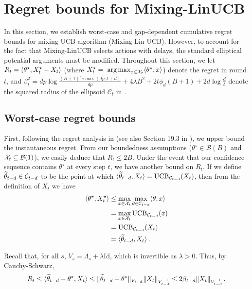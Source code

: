 \section{Regret bounds for Mixing-LinUCB}
\label{sec:bandit_regret}

In this section, we establish worst-case and gap-dependent cumulative regret bounds for mixing UCB algorithm (Mixing Lin-UCB). However, to account for the fact that Mixing-LinUCB selects actions with delays, the standard elliptical potential arguments must be modified. Throughout this section, we let $R_t = \langle\theta^{\star},X_t^{\star} - X_t\rangle$ (where $X_t^\star = \mathop{\mbox{ arg\,max}}_{x\in\mathcal{X}_t}\langle \theta^\star, x\rangle$) denote the regret in round $t$, and $\beta_{t}^2 = dp\log\tfrac{(B+1)^2e\max(dp,t+d)}{dp} + 4\lambda B^2 + 2t\phi_d (B+1) + 2d\log\tfrac{d}{\delta}$ denote the squared radius of the ellipsoid $\mathcal{C}_t$ in . %

\subsection{Worst-case regret bounds}

First, following the regret analysis in \citet{abbasi2011improved} (see also Section 19.3 in \citealp{lattimore2020bandit}), we upper bound the instantaneous regret. From our boundedness assumptions ($\theta^\star\in\mathcal B(B)$ and $\mathcal{X}_t\subseteq\mathcal B(1)$), we easily deduce that $R_t \leq 2B$. Under the event that our confidence sequence contains $\theta^{\star}$ at every step $t$, we have another bound on $R_t$. If we define $\widetilde\theta_{t-d} \in \mathcal{C}_{t-d}$ to be the point at which $\langle\widetilde\theta_{t-d},X_t\rangle = \mathrm{UCB}_{\mathcal{C}_{t-d}}(X_t)$, then from the definition of $X_t$ we have
\begin{align*}
\langle\theta^{\star},X_t^{\star}\rangle &\leq \max_{x \in \mathcal{X}_{t}}\max_{\theta \in \mathcal{C}_{t-d}}\langle\theta,x\rangle\\ &= \max_{x \in \mathcal{X}_{t}} \mathrm{UCB}_{\mathcal{C}_{t-d}}(x) \\&= \mathrm{UCB}_{\mathcal{C}_{t-d}}(X_t)\\&=\langle\widetilde\theta_{t-d},X_t\rangle\,.
\end{align*}

Recall that, for all $s$, $V_s = \Lambda_s + \lambda\mathrm{Id}$, which is invertible as $\lambda>0$. Thus, by Cauchy-Schwarz,
\begin{equation*}
R_t \leq \langle\widetilde\theta_{t-d} - \theta^{\star},X_t\rangle \leq \|\widetilde\theta_{t-d} - \theta^{\star}\|_{V_{t-d}}\|X_t\|_{V_{t-d}^{-1}} \leq 2\beta_{t-d}\|X_t\|_{V_{t-d}^{-1}}\,.
\end{equation*}

